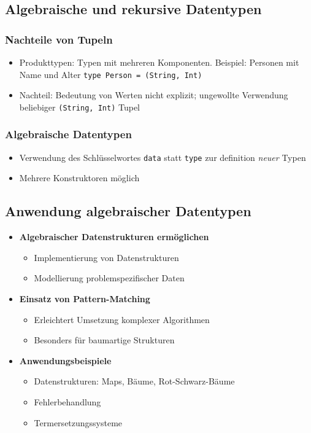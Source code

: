 \subsection{Algebraische und rekursive Datentypen}

\subsubsection{Nachteile von Tupeln}
\begin{itemize}
	\item Produkttypen: Typen mit mehreren Komponenten. Beispiel: Personen mit Name und Alter \texttt{type Person = (String, Int)}
	\item Nachteil: Bedeutung von Werten nicht explizit; ungewollte Verwendung beliebiger \texttt{(String, Int)} Tupel
\end{itemize}

\subsubsection{Algebraische Datentypen}
\begin{itemize}
	\item Verwendung des Schlüsselwortes \texttt{data} statt \texttt{type} zur definition \textit{neuer} Typen
	\item Mehrere Konstruktoren möglich
\end{itemize}

\subsection{Anwendung algebraischer Datentypen}
\begin{itemize}
	\item \textbf{Algebraischer Datenstrukturen ermöglichen}
	\begin{itemize}
		\item Implementierung von Datenstrukturen
		\item Modellierung problemspezifischer Daten
	\end{itemize}
	\item \textbf{Einsatz von Pattern-Matching}
	\begin{itemize}
		\item Erleichtert Umsetzung komplexer Algorithmen
		\item Besonders für baumartige Strukturen
	\end{itemize}
	\item \textbf{Anwendungsbeispiele}
	\begin{itemize}
		\item Datenstrukturen: Maps, Bäume, Rot-Schwarz-Bäume
		\item Fehlerbehandlung
		\item Termersetzungssysteme
	\end{itemize}
\end{itemize}



